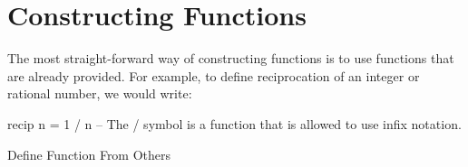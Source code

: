 \section{Constructing Functions}\label{sec:Constructing_Functions}
The most straight-forward way of constructing functions is to use functions that are already provided.
For example, to define reciprocation of an integer or rational number, we would write:
\begin{listing}[h!tbp]
\begin{haskellsource}
  recip n = 1 / n
  -- The / symbol is a function that is allowed to use infix notation.
\end{haskellsource}
\caption{Define Function From Others}
\label{lst:Define_Func_From_Others}
\end{listing}











